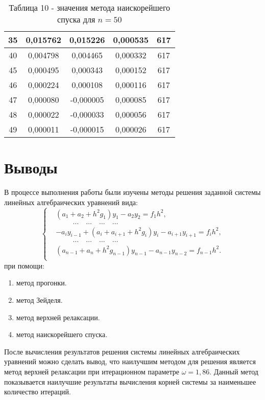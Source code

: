 \documentclass[a4paper,12pt]{article}
\begin{document}
{\begin{table}[h]
\begin{tabular}{|c|c|c|c|c|}
       35 &  0,015762 &  0,015226 &  0,000535 & 617 \\ \hline
       40 &  0,004798 &  0,004465 &  0,000332 & 617 \\ \hline
       45 &  0,000495 &  0,000343 &  0,000152 & 617 \\ \hline
       46 &  0,000224 &  0,000108 &  0,000116 & 617 \\ \hline
       47 &  0,000080 & -0,000005 &  0,000085 & 617 \\ \hline
       48 &  0,000022 & -0,000033 &  0,000056 & 617 \\ \hline
       49 &  0,000011 & -0,000015 &  0,000026 & 617 \\ \hline
    \end{tabular}
    \caption*{\small{Таблица 10 - значения метода наискорейшего спуска для $n = 50$}}
\end{table}
\clearpage
\section{Выводы}
\hspace{1.25cm}В процессе выполнения работы были изучены методы решения заданной системы линейных алгебраических уравнений вида:
\begin{equation*}
    \begin{cases}
        &(a_1 + a_2 + h^2g_1)y_1 - a_2y_2 = f_1h^2,\\
        &\hspace{1cm}\dots \quad \dots \quad \dots \quad \dots\\
        &-a_iy_{i-1} + (a_i + a_{i+1} + h^2g_i)y_i - a_{i+1}y_{i+1} = f_ih^2,\\
        &\hspace{1cm}\dots \quad \dots \quad \dots \quad \dots\\
        &(a_{n-1} + a_{n} + h^2g_{n-1})y_{n-1} - a_{n-1}y_{n-2} = f_{n-1}h^2.\\
    \end{cases}
\end{equation*}
при помощи:
\begin{enumerate}[label = \arabic*.]
    \item метод прогонки.
    \item метод Зейделя.
    \item метод верхней релаксации.
    \item метод наискорейшего спуска.
\end{enumerate}

После вычисления результатов решения системы линейных алгебраических уравнений можно сделать вывод, 
что наилучшим методом для решения является метод верхней релакса\-ции при итерационном параметре $\omega = 1,86$. 
Данный метод показывается наилучшие результа\-ты вычисления корней системы за наименьшее количество итераций.
}
\clearpage
\end{document}
